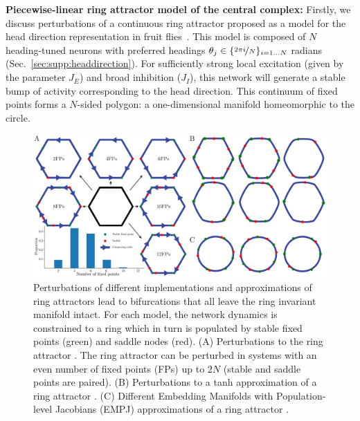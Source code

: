 \documentclass{article} %
\newcommand{\ptitle}[1]{\textbf{#1:}\xspace}
\newcounter{ct}
\theoremstyle{definition}
\theoremstyle{remark}
\begin{document}
\ptitle{Piecewise-linear ring attractor model of the central complex}
Firstly, we discuss perturbations of a continuous ring attractor proposed as a model for the head direction representation in fruit flies~\citep{Noorman2022}.
This model is composed of \(N\) heading-tuned neurons with preferred headings \(\theta_{j} \in \{\nicefrac{2\pi i}{N}\}_{i = 1\dots N}\) radians (Sec.~\ref{sec:supp:headdirection}).
For sufficiently strong local excitation (given by the parameter \(J_{E}\)) and broad inhibition (\(J_{I}\)), this network will generate a stable bump of activity corresponding to the head direction.
This continuum of fixed points forms a \(N\)-sided polygon: a one-dimensional manifold homeomorphic to the circle.

\begin{figure}[tbhp]
     \centering
  \includegraphics[width=\textwidth]{bio_rings}
       \caption{ Perturbations of different implementations and approximations of ring attractors lead to bifurcations that all leave the ring invariant manifold intact. For each model, the network dynamics is constrained to a ring which in turn is populated by stable fixed points (green) and saddle nodes (red).
       (A) 	Perturbations to the ring attractor \citep{Noorman2022}. The ring attractor can be perturbed in systems with an even number of fixed points (FPs) up to \(2N\) (stable and saddle points are paired).
       (B) 	Perturbations to a tanh approximation of a ring attractor \citep{seeholzer2017efficient}.
       (C) 	Different Embedding Manifolds with Population-level Jacobians (EMPJ) approximations of a ring attractor \citep{pollock2020}.
       }\label{fig:bio_rings}
\end{figure}
\end{document}
